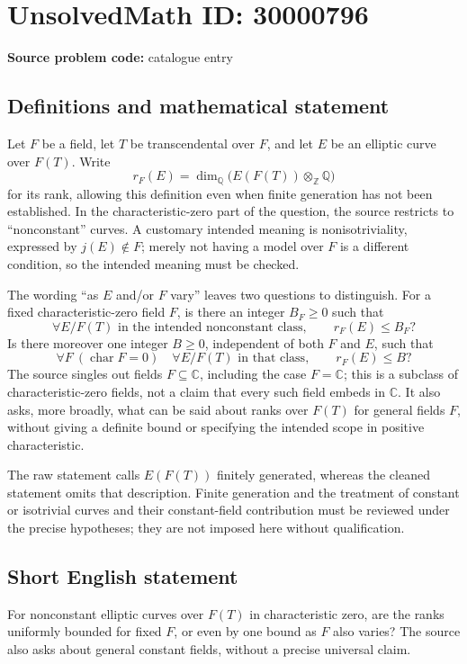 \documentclass[11pt]{article}
\newcommand{\Z}{\mathbb{Z}}
\newcommand{\Q}{\mathbb{Q}}
\newcommand{\C}{\mathbb{C}}
\begin{document}
\section*{UnsolvedMath ID: 30000796}
\textbf{Source problem code:} catalogue entry
\subsection{Definitions and mathematical statement}
Let \(F\) be a field, let \(T\) be transcendental over \(F\), and let \(E\) be an elliptic curve over \(F(T)\). Write
\[
r_F(E)=\dim_{\Q}\bigl(E(F(T))\otimes_{\Z}\Q\bigr)
\]
for its rank, allowing this definition even when finite generation has not been established. In the characteristic-zero part of the question, the source restricts to ``nonconstant'' curves. A customary intended meaning is nonisotriviality, expressed by \(j(E)\notin F\); merely not having a model over \(F\) is a different condition, so the intended meaning must be checked.

The wording ``as \(E\) and/or \(F\) vary'' leaves two questions to distinguish. For a fixed characteristic-zero field \(F\), is there an integer \(B_F\geq0\) such that
\[
\forall E/F(T)\text{ in the intended nonconstant class},\qquad r_F(E)\leq B_F?
\]
Is there moreover one integer \(B\geq0\), independent of both \(F\) and \(E\), such that
\[
\forall F\ (\operatorname{char}F=0)\quad
\forall E/F(T)\text{ in that class},\qquad r_F(E)\leq B?
\]
The source singles out fields \(F\subseteq\C\), including the case \(F=\C\); this is a subclass of characteristic-zero fields, not a claim that every such field embeds in \(\C\). It also asks, more broadly, what can be said about ranks over \(F(T)\) for general fields \(F\), without giving a definite bound or specifying the intended scope in positive characteristic.

The raw statement calls \(E(F(T))\) finitely generated, whereas the cleaned statement omits that description. Finite generation and the treatment of constant or isotrivial curves and their constant-field contribution must be reviewed under the precise hypotheses; they are not imposed here without qualification.
\subsection{Short English statement}
For nonconstant elliptic curves over \(F(T)\) in characteristic zero, are the ranks uniformly bounded for fixed \(F\), or even by one bound as \(F\) also varies? The source also asks about general constant fields, without a precise universal claim.
\end{document}
